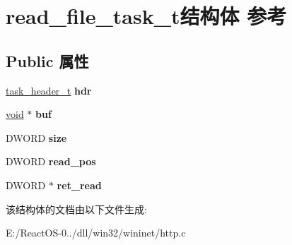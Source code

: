\hypertarget{structread__file__task__t}{}\section{read\+\_\+file\+\_\+task\+\_\+t结构体 参考}
\label{structread__file__task__t}
\subsection*{Public 属性}
\begin{DoxyCompactItemize}
\item 
\mbox{\label{structread__file__task__t_a9fddd8fec26d0453809ea92132b7b429}} 
\hyperlink{structtask__header__t}{task\+\_\+header\+\_\+t} {\bfseries hdr}
\item 
\mbox{\label{structread__file__task__t_aa5e87df32c834434c21789a7f1267ef1}} 
\hyperlink{interfacevoid}{void} $\ast$ {\bfseries buf}
\item 
\mbox{\label{structread__file__task__t_a38b0d142f94059d77215d3fc06583c02}} 
D\+W\+O\+RD {\bfseries size}
\item 
\mbox{\label{structread__file__task__t_aefb9b81be6ad11b5789b670844c35f3c}} 
D\+W\+O\+RD {\bfseries read\+\_\+pos}
\item 
\mbox{\label{structread__file__task__t_a164aaac630df96c50d4c7c55b4f030e8}} 
D\+W\+O\+RD $\ast$ {\bfseries ret\+\_\+read}
\end{DoxyCompactItemize}


该结构体的文档由以下文件生成\+:\begin{DoxyCompactItemize}
\item 
E\+:/\+React\+O\+S-\/0../dll/win32/wininet/http.\+c\end{DoxyCompactItemize}
